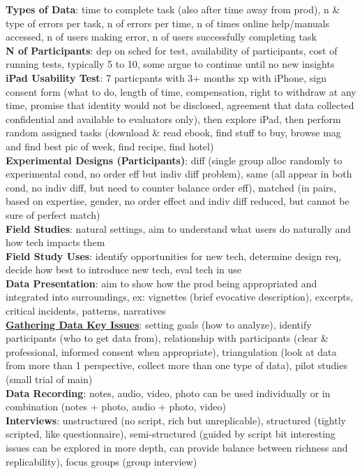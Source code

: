 \documentclass[a4paper]{article}
\begin{document}
\begin{multicols}{3}
        \textbf{Types of Data}: time to complete task (also after time away from prod), n \& type of errors per task, n of errors per time, n of times online help/manuals accessed, n of users making error, n of users successfully completing task\\
        \textbf{N of Participants}: dep on sched for test, availability of participants, cost of running tests, typically 5 to 10, some argue to continue until no new insights\\
        \textbf{iPad Usability Test}: 7 particpants with 3+ months xp with iPhone, sign consent form (what to do, length of time, compensation, right to withdraw at any time, promise that identity would not be disclosed, agreement that data collected confidential and available to evaluators only), then explore iPad, then perform random assigned tasks (download \& read ebook, find stuff to buy, browse mag and find best pic of week, find recipe, find hotel)\\
        \textbf{Experimental Designs (Participants)}: diff (single group alloc randomly to experimental cond, no order eff but indiv diff problem), same (all appear in both cond, no indiv diff, but need to counter balance order eff), matched (in pairs, based on expertise, gender, no order effect and indiv diff reduced, but cannot be sure of perfect match)\\
        \textbf{Field Studies}: natural settings, aim to understand what users do naturally and how tech impacts them\\
        \textbf{Field Study Uses}: identify opportunities for new tech, determine design req, decide how best to introduce new tech, eval tech in use\\
        \textbf{Data Presentation}: aim to show how the prod being appropriated and integrated into surroundings, ex: vignettes (brief evocative description), excerpts, critical incidents, patterns, narratives\\
        \underline{\textbf{Gathering Data Key Issues}}: setting goals (how to analyze), identify participants (who to get data from), relationship with participants (clear \& professional, informed consent when appropriate), triangulation (look at data from more than 1 perspective, collect more than one type of data), pilot studies (small trial of main)\\
        \textbf{Data Recording}: notes, audio, video, photo can be used individually or in combination (notes + photo, audio + photo, video)\\
        \textbf{Interviews}: unstructured (no script, rich but unreplicable), structured (tightly scripted, like questionnaire), semi-structured (guided by script bit interesting issues can be explored in more depth, can provide balance between richness and replicability), focus groups (group interview)\\

\end{multicols}
\end{document}
